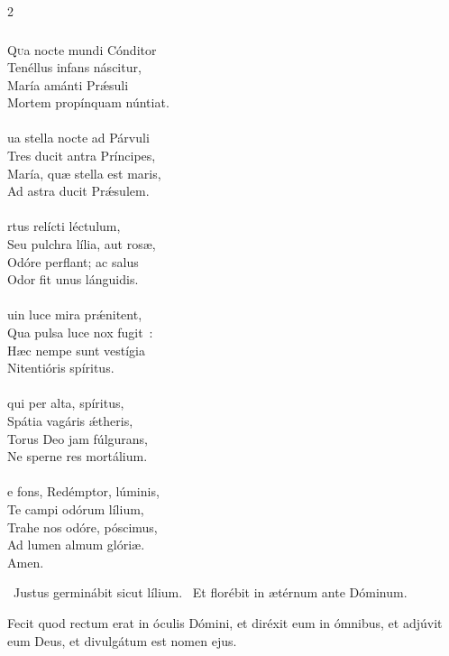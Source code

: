 \documentclass[9pt,twoside]{extarticle}
\begin{document}
\begin{multicols}{2}
{\subsubsection*{\center {}}
\begin{center}\end{center}
\lettrine{Q}ua nocte mundi Cónditor\\
Tenéllus infans náscitur,\\
María amánti Prǽsuli\\
Mortem propínquam núntiat.\\
\\
ua stella nocte ad Párvuli\\
Tres ducit antra Príncipes,\\
María, quæ stella est maris,\\
Ad astra ducit Prǽsulem.\\
\\
rtus relícti léctulum,\\
Seu pulchra lília, aut rosæ,\\
Odóre perflant; ac salus\\
Odor fit unus lánguidis.\\
\\
uin luce mira prǽnitent,\\
Qua pulsa luce nox fugit~:\\
Hæc nempe sunt vestígia\\
Nitentióris spíritus.\\
\\
 qui per alta, spíritus,\\
Spátia vagáris ǽtheris,\\
Torus Deo jam fúlgurans,\\
Ne sperne res mortálium.\\
\\
e fons, Redémptor, lúminis,\\
Te campi odórum lílium,\\
Trahe nos odóre, póscimus,\\
Ad lumen almum glóriæ.\\
Amen.

\begin{tightlist}{}
\item {}~Justus germinábit sicut lílium. ~Et florébit in ætérnum ante Dóminum.
\item {} Fecit quod rectum erat in óculis Dómini, et diréxit eum in ómnibus, et adjúvit eum Deus, et divulgátum est nomen ejus.
\end{tightlist}

}
\end{multicols}
\end{document}
